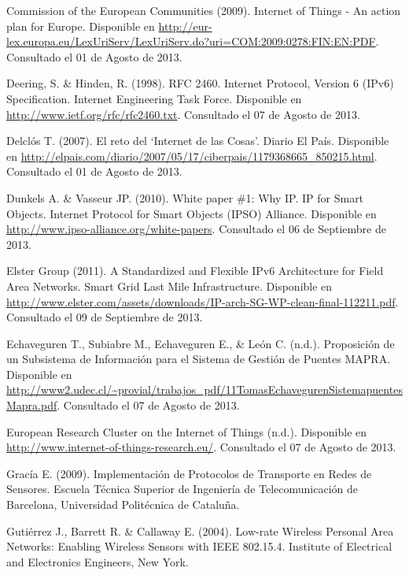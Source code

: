 \begin{spacing}{1.0}
\begin{thebibliography}{99}
Commission of the European Communities (2009).
\newblock Internet of Things - An action plan for Europe.
\newblock Disponible en \url{http://eur-lex.europa.eu/LexUriServ/LexUriServ.do?uri=COM:2009:0278:FIN:EN:PDF}.
\newblock Consultado el 01 de Agosto de 2013.

Deering, S. \& Hinden, R. (1998).
\newblock RFC 2460. Internet Protocol, Version 6 (IPv6) Specification. Internet Engineering Task Force.
\newblock Disponible en \url{http://www.ietf.org/rfc/rfc2460.txt}.
\newblock Consultado el 07 de Agosto de 2013.

Delclós T. (2007).
\newblock El reto del `Internet de las Cosas'. Diario El País.
\newblock Disponible en \url{http://elpais.com/diario/2007/05/17/ciberpais/1179368665_850215.html}.
\newblock Consultado el 01 de Agosto de 2013.

Dunkels A. \& Vasseur JP. (2010).
\newblock White paper \#1: Why IP. IP for Smart Objects.
\newblock Internet Protocol for Smart Objects (IPSO) Alliance.
\newblock Disponible en \url{http://www.ipso-alliance.org/white-papers}.
\newblock Consultado el 06 de Septiembre de 2013.

Elster Group (2011).
\newblock A Standardized and Flexible IPv6 Architecture for Field Area Networks.
\newblock Smart Grid Last Mile Infrastructure.
\newblock Disponible en \url{http://www.elster.com/assets/downloads/IP-arch-SG-WP-clean-final-112211.pdf}.
\newblock Consultado el 09 de Septiembre de 2013.

Echaveguren T., Subiabre M., Echaveguren E., \& León C. (n.d.).
\newblock Proposición de un Subsistema de Información para el Sistema de Gestión de Puentes MAPRA.
\newblock Disponible en \url{http://www2.udec.cl/~provial/trabajos_pdf/11TomasEchavegurenSistemapuentesMapra.pdf}.
\newblock Consultado el 07 de Agosto de 2013.

European Research Cluster on the Internet of Things (n.d.).
\newblock Disponible en \url{http://www.internet-of-things-research.eu/}.
\newblock Consultado el 07 de Agosto de 2013.

Gracía E. (2009).
\newblock Implementación de Protocolos de Transporte en Redes de Sensores.
\newblock Escuela Técnica Superior de Ingeniería de Telecomunicación de Barcelona,
\newblock Universidad Politécnica de Cataluña.

Gutiérrez J., Barrett R. \& Callaway E. (2004).
\newblock Low-rate Wireless Personal Area Networks: Enabling Wireless Sensors with IEEE 802.15.4.
\newblock Institute of Electrical and Electronics Engineers, New York.


\end{thebibliography}
\end{spacing}
